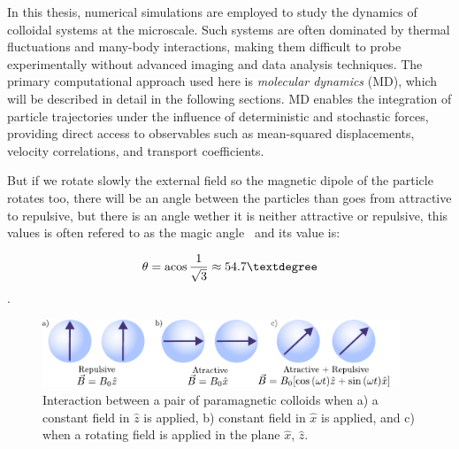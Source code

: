In this thesis, numerical simulations are employed to study the dynamics of colloidal systems at the microscale. Such systems are often dominated by thermal fluctuations and many-body interactions, making them difficult to probe experimentally without advanced imaging and data analysis techniques. The primary computational approach used here is \textit{molecular dynamics} (MD), which will be described in detail in the following sections. MD enables the integration of particle trajectories under the influence of deterministic and stochastic forces, providing direct access to observables such as mean-squared displacements, velocity correlations, and transport coefficients.



But if we rotate slowly the external field so the magnetic dipole of the particle rotates too, there will be an angle between the particles than goes from attractive to repulsive, but there is an angle wether it is neither attractive or repulsive, this values is often refered to as the magic angle~\cite{erickson1993magic, hennel2004magic} and its value is:

\[ \theta = \acos{\frac{1}{\sqrt{3}}} \approx 54.7°  \].

\begin{figure}
  \begin{center}
    \includegraphics[width=0.95\textwidth]{figures/colloidsdynamics1.pdf}
  \end{center}
  \caption[Basic interaction for a pair of paramagnetic colloids.]{Interaction between a pair of paramagnetic colloids when a) a constant field in $\hat{z}$ is applied, b) constant field in $\hat{x}$ is applied, and c) when a rotating field is applied in the plane $\hat{x}$, $\hat{z}$.}\label{fig:pairinteraction}
\end{figure}

